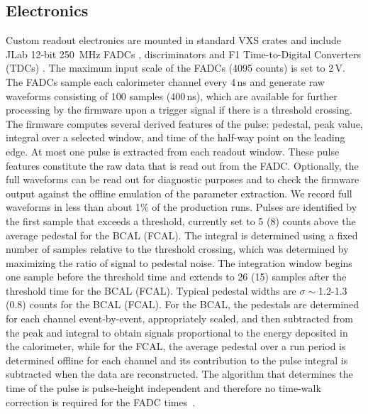 \subsection{Electronics \label{sec:calelectronics}}
Custom readout electronics are mounted in standard VXS crates and include 
JLab 12-bit 250~MHz FADCs \cite{hdnote1022}, discriminators \cite{hdnote2511} and F1 Time-to-Digital Converters (TDCs) \cite{hdnote1021}. The maximum input scale of the FADCs (4095 counts) is set to 2\,V.
The FADCs sample each calorimeter channel every 4\,ns and generate raw waveforms consisting of 100 samples 
 (400\,ns), which are available for further processing by the firmware upon a trigger signal if there is a threshold crossing. The firmware computes several derived features of the pulse: pedestal, peak value, integral over a selected window, and
 time of the half-way point on the leading edge. At most one pulse is extracted from each readout window. These pulse features constitute the raw data that is read out from the FADC. 
 Optionally, the full waveforms can be read out for diagnostic purposes
 and to check the firmware output against the offline emulation of the parameter extraction. We record full waveforms in less than about 1\% of the production runs. 
 Pulses are identified by the first sample that exceeds a threshold, 
 currently set to 5 (8) counts above the average pedestal for the BCAL (FCAL).  The integral is determined using a fixed number of samples relative to the threshold crossing, 
 which was determined by maximizing the ratio of signal to pedestal noise. 
 The integration window begins one sample before the threshold time and extends to 26 (15) samples after the threshold time for the BCAL (FCAL).
 Typical pedestal widths are $\sigma\sim$1.2-1.3 (0.8) counts for the BCAL (FCAL).  For the BCAL, the pedestals are determined for each channel event-by-event, appropriately scaled, and then subtracted from the peak and integral to obtain signals proportional to the energy deposited in the calorimeter, while for the FCAL, the average pedestal over a run period is determined offline for each channel and its contribution to the pulse integral is subtracted when the data are reconstructed.%
 The algorithm that determines the time of the pulse is pulse-height independent and therefore no time-walk correction is required for the FADC times~\cite{Bennett:2010nf}.

